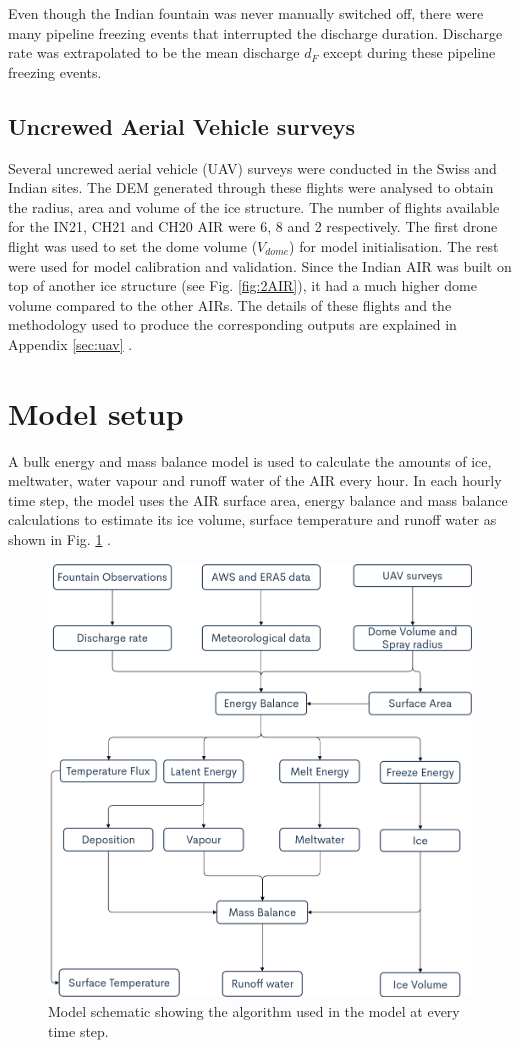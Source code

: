 \documentclass[utf8]{frontiersSCNS}
\begin{document}
Even though the Indian fountain was never manually switched off, there were many pipeline freezing events that
interrupted the discharge duration. Discharge rate was extrapolated to be the mean discharge $d_F$ except during
these pipeline freezing events.

\subsection{Uncrewed Aerial Vehicle surveys}

Several uncrewed aerial vehicle (UAV) surveys were conducted in the Swiss and Indian sites. The DEM generated
through these flights were analysed to obtain the radius, area and volume of the ice structure. The number of
flights available  for the IN21, CH21 and CH20 AIR were 6, 8 and 2 respectively. The first drone flight was
used to set the dome volume ($V_{dome}$) for model initialisation. The rest were used for model calibration and
validation. Since the Indian AIR was built on top of another ice structure (see Fig. \ref{fig:2AIR}),
it had a much higher dome volume compared to the other AIRs.  The details of these flights and the methodology
used to produce the corresponding outputs are explained in Appendix \ref{sec:uav} .


\section{Model setup}

A bulk energy and mass balance model is used to calculate the amounts of ice, meltwater, water vapour and runoff
water of the AIR every hour. In each hourly time step, the model uses the AIR surface area, energy balance and mass
balance calculations to estimate its ice volume, surface temperature and runoff water as shown in Fig.
\ref{fig:schema} .

\begin{figure}
	\begin{center}
		\includegraphics[width=10 cm]{Figures/model_schematic.png}
	\end{center}
	\caption{Model schematic showing the algorithm used in the model at every time step. }
	\label{fig:schema}
\end{figure}
\end{document}
